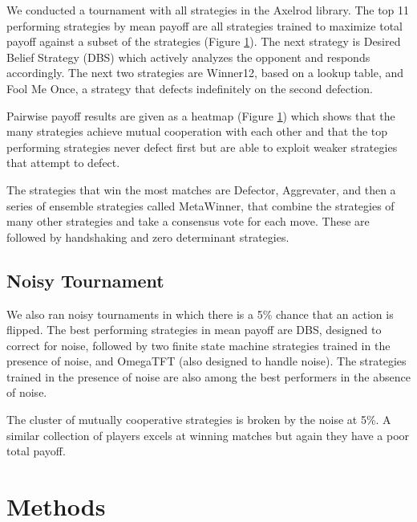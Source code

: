 \documentclass{article}
\begin{document}
We conducted a tournament with all strategies in the Axelrod library. The top
11 performing strategies by mean payoff are all strategies trained to maximize
total payoff against a subset of the strategies (Figure \ref{}). The next strategy is
Desired Belief Strategy (DBS) which actively analyzes the opponent and responds
accordingly. The next two strategies are Winner12, based on a lookup table, and
Fool Me Once, a strategy that defects indefinitely on the second defection.

Pairwise payoff results are given as a heatmap (Figure \ref{}) which
shows that the many strategies achieve mutual cooperation with each other and
that the top performing strategies never defect first but are able to exploit
weaker strategies that attempt to defect.

The strategies that win the most matches are Defector, Aggrevater, and then a
series of ensemble strategies called MetaWinner, that combine the strategies
of many other strategies and take a consensus vote for each move. These are
followed by handshaking and zero determinant strategies.


\subsection{Noisy Tournament}

We also ran noisy tournaments in which there is a 5\% chance that an action
is flipped. The best performing strategies in mean payoff are DBS, designed
to correct for noise, followed by two finite state machine strategies trained
in the presence of noise, and OmegaTFT (also designed to handle noise). The
strategies trained in the presence of noise are also among the best performers
in the absence of noise.

The cluster of mutually cooperative strategies is broken by the noise at 5\%. A
similar collection of players excels at winning matches but again they have
a poor total payoff.


\section{Methods}
\end{document}
